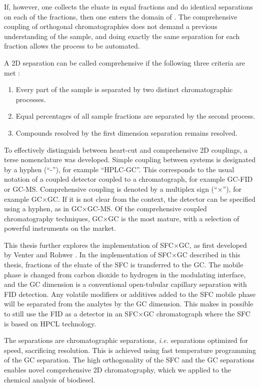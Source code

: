 If, however, one collects the eluate in equal fractions and do identical
separations on each of the fractions, then one enters the domain of
. The comprehensive coupling of
orthogonal chromatographies does not demand a previous understanding of the
sample, and doing exactly the same separation for each fraction allows the
process to be automated.

A 2D separation can be called comprehensive if the following three criteria are
met \autocite{Giddings1987}:

\begin{enumerate}
  \item Every part of the sample is separated by two distinct chromatographic processes.
  \item Equal percentages of all sample fractions are separated by the second process.	 
  \item Compounds resolved by the first dimension separation remains resolved.  
\end{enumerate} 

To effectively distinguish between heart-cut and comprehensive 2D couplings, a
terse nomenclature was developed. Simple coupling between systems is designated
by a hyphen (``-''), for example ``HPLC-GC''. This corresponds to the usual
notation of a coupled detector coupled to a chromatograph, for example GC-FID or
GC-MS. Comprehensive coupling is denoted by a multiplex sign (``×''), for
example GC×GC. If it is not clear from the context, the detector can be
specified using a hyphen, as in GC×GC-MS. Of the comprehensive coupled
chromatography techniques, GC×GC is the most mature, with a selection of
powerful instruments on the market.

This thesis further explores the implementation of SFC×GC, as first developed by
Venter and Rohwer \autocite{Venter2004, Venter2006}. In the implementation of
SFC×GC described in this thesis, fractions of the eluate of the SFC is
transferred to the GC. The mobile phase is changed from carbon dioxide to
hydrogen in the modulating interface, and the GC dimension is a conventional
open-tubular capillary separation with FID detection. Any volatile modifiers or
additives added to the SFC mobile phase will be separated from the analytes by
the GC dimension. This makes in possible to still use the FID as a detector in
an SFC×GC chromatograph where the SFC is based on HPCL technology.

The \twoD separations are  chromatographic separations,
\textit{i.e.} separations optimized for speed, sacrificing resolution. This is
achieved using fast temperature programming of the GC separation. The high
orthogonality of the SFC and the GC separations enables novel comprehensive 2D
chromatography, which we applied to the chemical analysis of biodiesel.
